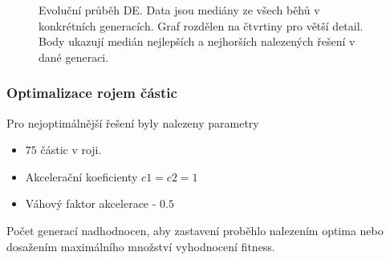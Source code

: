 \begin{figure}[H]
{\begin{tabular}{cc}
    \end{tabular}
    }
    \caption{Evoluční průběh DE. Data jsou mediány ze všech běhů v konkrétních generacích. Graf rozdělen na čtvrtiny pro větší detail. Body ukazují medián nejlepších a nejhorších nalezených řešení v dané generaci.}
    \label{fg:bench:rosenbrock:de:evoProg}
\end{figure}


\subsubsection{Optimalizace rojem částic}
Pro nejoptimálnější řešení byly nalezeny parametry 
\begin{itemize}
    \item $75$ částic v roji.
    \item Akcelerační koeficienty $c1 = c2 = 1$ 
    \item Váhový faktor akcelerace - $0.5$
\end{itemize}
Počet generací nadhodnocen, aby zastavení proběhlo nalezením optima nebo dosažením maximálního množství vyhodnocení fitness.

